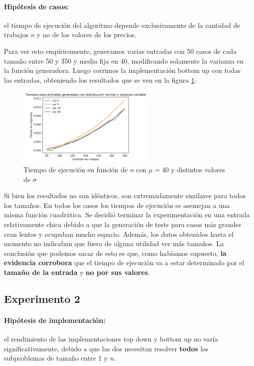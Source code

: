 \documentclass[a4paper]{report}
\begin{document}
\paragraph{Hipótesis de casos: } el tiempo de ejecución del algoritmo depende exclusivamente de la cantidad de trabajos \textit{n} y no de los valores de los precios.

Para ver esto empíricamente, generamos varias entradas con 50 casos de cada tamaño entre 50 y 350 y media fija en 40, modificando solamente la varianza en la función generadora. Luego corrimos la implementación bottom up con todas las entradas, obteniendo los resultados que se ven en la figura \ref{fig:varianza}:

\begin{figure}
    \includegraphics[width=0.6\textwidth]{varianza.png}
    \caption{Tiempo de ejecución en función de \textit{n} con $\mu = 40$ y distintos valores de $\sigma$}
    \label{fig:varianza}
\end{figure}

Si bien los resultados no son idénticos, son extremadamente similares para todos los tamaños. En todos los casos los tiempos de ejecución se asemejan a una misma función cuadrática. Se decidió terminar la experimentación en una entrada relativamente chica debido a que la generación de tests para casos más grandes eran lentos y ocupaban mucho espacio. Además, los datos obtenidos hasta el momento no indicaban que fuera de alguna utilidad ver más tamaños. La conclusión que podemos sacar de esto es que, como habíamos supuesto, \textbf{la evidencia corrobora} que el tiempo de ejecución va a estar determinado por el \textbf{tamaño de la entrada} y \textbf{no por sus valores}.

\clearpage

\subsection{Experimento 2}

\paragraph{Hipótesis de implementación: } el rendimiento de las implementaciones top down y bottom up no varía significativamente, debido a que las dos necesitan resolver \textbf{todos} los subproblemas de tamaño entre 1 y \textit{n}.
\end{document}
